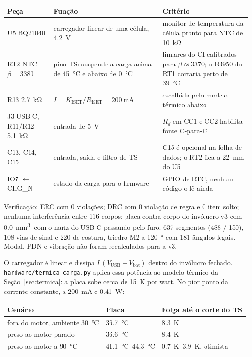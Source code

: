 \documentclass[10pt,a4paper,landscape]{article}
\newcommand{\arq}[1]{\texttt{#1}}
\begin{document}
\begin{table}[H]\footnotesize
\begin{tabularx}{\textwidth}{@{}Y{0.7} Y{1.1} Y{1.2}@{}}
\toprule
\textbf{Peça} & \textbf{Função} & \textbf{Critério} \\
\midrule
U5 BQ21040 & carregador linear de uma célula, \SI{4.2}{\volt} & monitor de temperatura da célula pronto para NTC de \SI{10}{\kilo\ohm} \\
RT2 NTC $\beta=3380$ & pino TS: suspende a carga acima de \SI{45}{\celsius} e abaixo de \SI{0}{\celsius} & limiares do CI calibrados para $\beta\approx3370$; o B3950 do RT1 cortaria perto de \SI{39}{\celsius} \\
R13 \SI{2.7}{\kilo\ohm} & $I = K_\text{ISET}/R_\text{ISET} = \SI{200}{\milli\ampere}$ & escolhida pelo modelo térmico abaixo \\
J3 USB-C, R11/R12 \SI{5.1}{\kilo\ohm} & entrada de \SI{5}{\volt} & $R_d$ em CC1 e CC2 habilita fonte C-para-C \\
C13, C14, C15 & entrada, saída e filtro do TS & C15 é opcional na folha de dados; o RT2 fica a \SI{22}{\milli\meter} do U5 \\
IO7 $\leftarrow$ CHG\_N & estado da carga para o firmware & GPIO de RTC; nenhum código o lê ainda \\
\bottomrule
\end{tabularx}
\end{table}

Verificação: ERC com 0 violações; DRC com 0 violação de regra e 0 item solto; nenhuma interferência entre 116 corpos; placa contra corpo do invólucro v3 com \SI{0.0}{\milli\meter\cubed}, com o nariz do USB-C passando pelo furo. 637 segmentos (488 / 150), 108 vias de sinal e 220 de costura, triedro M2 a \SI{120}{\degree} com 181 ângulos legais. Modal, PDN e vibração não foram recalculados para a v3.

O carregador é linear e dissipa $I\,(V_\text{USB}-V_\text{bat})$ dentro do invólucro fechado. \arq{hardware/termica\_carga.py} aplica essa potência ao modelo térmico da Seção~\ref{sec:termica}: a placa sobe cerca de \SI{15}{\kelvin} por watt. No pior ponto da corrente constante, a \SI{200}{\milli\ampere} e \SI{0.41}{\watt}:

\begin{table}[H]\footnotesize
\begin{tabularx}{\textwidth}{@{}Y{1.2} Y{0.9} Y{0.9}@{}}
\toprule
\textbf{Cenário} & \textbf{Placa} & \textbf{Folga até o corte do TS} \\
\midrule
fora do motor, ambiente \SI{30}{\celsius} & \SI{36.7}{\celsius} & \SI{8.3}{\kelvin} \\
preso ao motor parado & \SI{36.6}{\celsius} & \SI{8.4}{\kelvin} \\
preso ao motor a \SI{90}{\celsius} & \SIrange{41.1}{44.3}{\celsius} & \SIrange{0.7}{3.9}{\kelvin}, otimista \\
\bottomrule
\end{tabularx}
\end{table}
\end{document}
